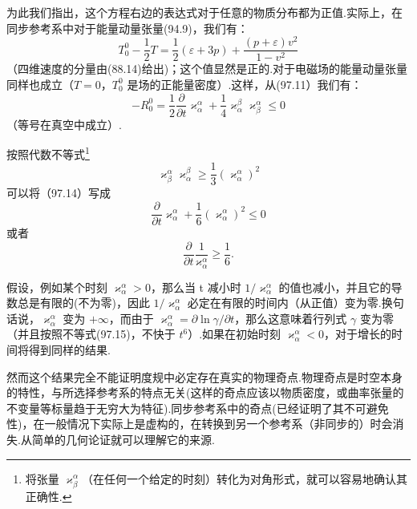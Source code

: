 为此我们指出，这个方程右边的表达式对于任意的物质分布都为正值.实际上，在同步参考系中对于能量动量张量(94.9)，我们有：
\begin{equation*}
  T^0_0-\frac{1}{2}T
  =\frac{1}{2}(\varepsilon+3p)
  +\frac{(p+\varepsilon)v^2}{1-v^2}
\end{equation*}
（四维速度的分量由(88.14)给出)；这个值显然是正的.对于电磁场的能量动量张量同样也成立（$T=0$，$T^0_0$ 是场的正能量密度）.这样，从(97.11）我们有：
\begin{equation}
  -R^0_0=\frac{1}{2}\frac{\partial}{\partial t}\varkappa_{\alpha}^{\alpha}
  +\frac{1}{4}\varkappa_{\alpha}^{\beta}\varkappa_{\beta}^{\alpha}
  \leqslant 0
\end{equation}
（等号在真空中成立）.

按照代数不等式\footnote{将张量 $\varkappa^{\alpha}_{\beta}$（在任何一个给定的时刻）转化为对角形式，就可以容易地确认其正确性.}
\begin{equation*}
  \varkappa^{\alpha}_{\beta}\varkappa^{\beta}_{\alpha}
  \geqslant\frac{1}{3}\left(\varkappa_{\alpha}^{\alpha}\right)^2
\end{equation*}
可以将（97.14）写成
\begin{equation*}
  \frac{\partial}{\partial t}\varkappa_{\alpha}^{\alpha}
  +\frac{1}{6}\left(\varkappa_{\alpha}^{\alpha}\right)^2\leqslant 0
\end{equation*}
或者
\begin{equation}
  \frac{\partial}{\partial t}\frac{1}{\varkappa_{\alpha}^{\alpha}}
  \geqslant\frac{1}{6}.
\end{equation}

假设，例如某个时刻 $\varkappa_{\alpha}^{\alpha}>0$，那么当 t 减小时 $1/\varkappa_{\alpha}^{\alpha}$ 的值也减小，并且它的导数总是有限的(不为零)，因此 $1/\varkappa_{\alpha}^{\alpha}$ 必定在有限的时间内（从正值）变为零.换句话说，$\varkappa_{\alpha}^{\alpha}$ 变为 $+\infty$，而由于 $\varkappa_{\alpha}^{\alpha}=\partial\ln\gamma/\partial t$，那么这意味着行列式 $\gamma$ 变为零（并且按照不等式(97.15)，不快于 $t^6$）.如果在初始时刻 $\varkappa_{\alpha}^{\alpha}<0$，对于增长的时间将得到同样的结果.

然而这个结果完全不能证明度规中必定存在真实的物理奇点.物理奇点是时空本身的特性，与所选择参考系的特点无关(这样的奇点应该以物质密度，或曲率张量的不变量等标量趋于无穷大为特征).同步参考系中的奇点(已经证明了其不可避免性)，在一般情况下实际上是虚构的，在转换到另一个参考系（非同步的）时会消失.从简单的几何论证就可以理解它的来源.

